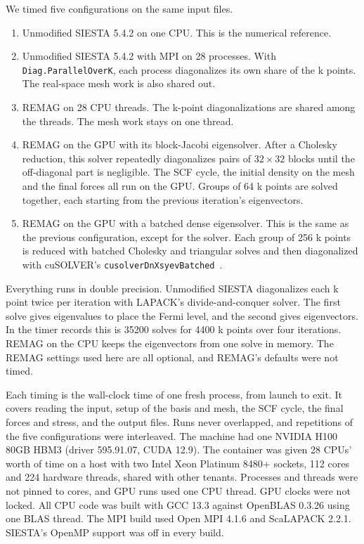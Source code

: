 We timed five configurations on the same input files.
\begin{enumerate}
\item Unmodified SIESTA 5.4.2 on one CPU. This is the numerical reference.
\item Unmodified SIESTA 5.4.2 with MPI on 28 processes. With \texttt{Diag.ParallelOverK}, each process diagonalizes its own share of the k points. The real-space mesh work is also shared out.
\item REMAG on 28 CPU threads. The k-point diagonalizations are shared among the threads. The mesh work stays on one thread.
\item REMAG on the GPU with its block-Jacobi eigensolver. After a Cholesky reduction, this solver repeatedly diagonalizes pairs of $32\times32$ blocks until the off-diagonal part is negligible. The SCF cycle, the initial density on the mesh and the final forces all run on the GPU. Groups of 64 k points are solved together, each starting from the previous iteration's eigenvectors.
\item REMAG on the GPU with a batched dense eigensolver. This is the same as the previous configuration, except for the solver. Each group of 256 k points is reduced with batched Cholesky and triangular solves and then diagonalized with cuSOLVER's \texttt{cusolverDnXsyevBatched}~\citep{cuSOLVER}.
\end{enumerate}
Everything runs in double precision. Unmodified SIESTA diagonalizes each k
point twice per iteration with LAPACK's divide-and-conquer solver. The first
solve gives eigenvalues to place the Fermi level, and the second gives
eigenvectors. In the timer records this is \num{35200} solves for
\num{4400} k points over four iterations. REMAG on the CPU keeps the
eigenvectors from one solve in memory. The REMAG settings used here are all
optional, and REMAG's defaults were not timed.

Each timing is the wall-clock time of one fresh process, from launch to exit.
It covers reading the input, setup of the basis and mesh, the SCF cycle, the
final forces and stress, and the output files. Runs never overlapped, and
repetitions of the five configurations were interleaved. The machine had one
NVIDIA H100 80GB HBM3 (driver 595.91.07, CUDA 12.9). The container was given
28 CPUs' worth of time on a host with two Intel Xeon Platinum 8480+ sockets,
112 cores and 224 hardware threads, shared with other tenants. Processes and
threads were not pinned to cores, and GPU runs used one CPU thread. GPU clocks
were not locked. All CPU code was built with GCC 13.3 against OpenBLAS 0.3.26
using one BLAS thread. The MPI build used Open MPI 4.1.6 and ScaLAPACK 2.2.1.
SIESTA's OpenMP support was off in every build.
